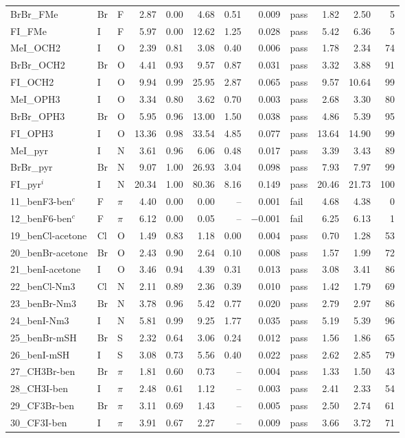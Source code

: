 {\begin{longtable}{lllrrrrrlrrr}
BrBr\_FMe & Br & F & 2.87 & 0.00 & 4.68 & 0.51 & 0.009 & pass & 1.82 & 2.50 & 5\\
FI\_FMe & I & F & 5.97 & 0.00 & 12.62 & 1.25 & 0.028 & pass & 5.42 & 6.36 & 5\\
MeI\_OCH2 & I & O & 2.39 & 0.81 & 3.08 & 0.40 & 0.006 & pass & 1.78 & 2.34 & 74\\
BrBr\_OCH2 & Br & O & 4.41 & 0.93 & 9.57 & 0.87 & 0.031 & pass & 3.32 & 3.88 & 91\\
FI\_OCH2 & I & O & 9.94 & 0.99 & 25.95 & 2.87 & 0.065 & pass & 9.57 & 10.64 & 99\\
MeI\_OPH3 & I & O & 3.34 & 0.80 & 3.62 & 0.70 & 0.003 & pass & 2.68 & 3.30 & 80\\
BrBr\_OPH3 & Br & O & 5.95 & 0.96 & 13.00 & 1.50 & 0.038 & pass & 4.86 & 5.39 & 95\\
FI\_OPH3 & I & O & 13.36 & 0.98 & 33.54 & 4.85 & 0.077 & pass & 13.64 & 14.90 & 99\\
MeI\_pyr & I & N & 3.61 & 0.96 & 6.06 & 0.48 & 0.017 & pass & 3.39 & 3.43 & 89\\
BrBr\_pyr & Br & N & 9.07 & 1.00 & 26.93 & 3.04 & 0.098 & pass & 7.93 & 7.97 & 99\\
FI\_pyr$^i$ & I & N & 20.34 & 1.00 & 80.36 & 8.16 & 0.149 & pass & 20.46 & 21.73 & 100\\
11\_benF3-ben$^c$ & F & $\pi$ & 4.40 & 0.00 & 0.00 & -- & 0.001 & fail & 4.68 & 4.38 & 0\\
12\_benF6-ben$^c$ & F & $\pi$ & 6.12 & 0.00 & 0.05 & -- & $-$0.001 & fail & 6.25 & 6.13 & 1\\
19\_benCl-acetone & Cl & O & 1.49 & 0.83 & 1.18 & 0.00 & 0.004 & pass & 0.70 & 1.28 & 53\\
20\_benBr-acetone & Br & O & 2.43 & 0.90 & 2.64 & 0.10 & 0.008 & pass & 1.57 & 1.99 & 72\\
21\_benI-acetone & I & O & 3.46 & 0.94 & 4.39 & 0.31 & 0.013 & pass & 3.08 & 3.41 & 86\\
22\_benCl-Nm3 & Cl & N & 2.11 & 0.89 & 2.36 & 0.39 & 0.010 & pass & 1.42 & 1.79 & 69\\
23\_benBr-Nm3 & Br & N & 3.78 & 0.96 & 5.42 & 0.77 & 0.020 & pass & 2.79 & 2.97 & 86\\
24\_benI-Nm3 & I & N & 5.81 & 0.99 & 9.25 & 1.77 & 0.035 & pass & 5.19 & 5.39 & 96\\
25\_benBr-mSH & Br & S & 2.32 & 0.64 & 3.06 & 0.24 & 0.012 & pass & 1.56 & 1.86 & 65\\
26\_benI-mSH & I & S & 3.08 & 0.73 & 5.56 & 0.40 & 0.022 & pass & 2.62 & 2.85 & 79\\
27\_CH3Br-ben & Br & $\pi$ & 1.81 & 0.60 & 0.73 & -- & 0.004 & pass & 1.33 & 1.50 & 43\\
28\_CH3I-ben & I & $\pi$ & 2.48 & 0.61 & 1.12 & -- & 0.003 & pass & 2.41 & 2.33 & 54\\
29\_CF3Br-ben & Br & $\pi$ & 3.11 & 0.69 & 1.43 & -- & 0.005 & pass & 2.50 & 2.74 & 61\\
30\_CF3I-ben & I & $\pi$ & 3.91 & 0.67 & 2.27 & -- & 0.009 & pass & 3.66 & 3.72 & 71\\
\end{longtable}}
